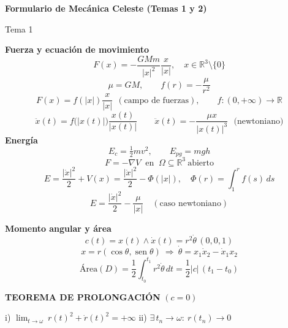 \documentclass[10pt,a4paper]{extarticle}
\newcommand{\sen}{\operatorname{sen}}
\newcommand{\R}{\mathbb{R}}
\begin{document}
\begin{center}
 {\large\textbf{Formulario de Mecánica Celeste (Temas 1 y 2)}}
\end{center}
\vspace{-6pt}

\begin{bx}{Tema 1}
\begin{minipage}[t]{0.485\linewidth}
\textbf{Fuerza y ecuación de movimiento}
\[F(x)=-\frac{GMm}{|x|^2}\frac{x}{|x|},\quad x\in\R^3\setminus\{0\}\]
\[\mu=GM,\qquad f(r)=-\frac{\mu}{r^2}\]
\[F(x)=f(|x|)\frac{x}{|x|}\ \ (\text{campo de fuerzas}),\qquad f:(0,+\infty)\to\R\]
\[\ddot x(t)=f\big(|x(t)|\big)\frac{x(t)}{|x(t)|} \qquad \ddot{x}(t) = - \frac{\mu x}{|x(t)|^3}\ \ \ \text{(newtoniano)}\]
\textbf{Energía}
\[E_c=\tfrac12 mv^2,\qquad E_{pg}=mgh\]
\[F=-\nabla V\ \text{ en }\ \Omega\subseteq\R^3\ \text{abierto}\]
\[E=\frac{|\dot x|^2}{2}+V(x)=\frac{|\dot x|^2}{2}-\Phi(|x|),\quad \Phi(r)=\int_1^r f(s)\,ds\]
\[E=\frac{|\dot x|^2}{2}-\frac{\mu}{|x|}\quad(\text{caso newtoniano})\]
\end{minipage}\hfill\vrule\hfill
\begin{minipage}[t]{0.485\linewidth}
\textbf{Momento angular y área}
\[c(t)=x(t)\wedge\dot x(t)=r^2\dot\theta\,(0,0,1)\]
\[x=r(\cos\theta,\sen\theta)\ \Rightarrow\ \dot\theta=x_1\dot x_2-\dot x_1x_2\]
\[\text{Área}(D)=\frac12\int_{t_0}^{t_1}r^2\dot\theta\,dt=\frac12|c|\,(t_1-t_0)\]
\vspace{1cm}
\begin{key}\centering\textbf{TEOREMA DE PROLONGACIÓN} $(c=0)$\\[2pt]
\raggedright
i) $\displaystyle\lim_{t\to\omega}\ r(t)^2+\dot r(t)^2=+\infty$\qquad
ii) $\exists\,t_n\to\omega:\ r(t_n)\to0$
\end{key}
\end{minipage}
\end{bx}
\end{document}
